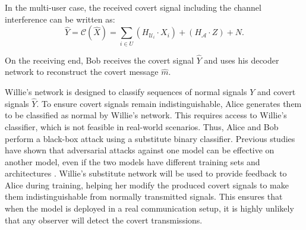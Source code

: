 In the multi-user case, the received covert signal including the channel interference can be written as:
\begin{equation}
	\hat{Y} = \mathcal{C}(\hat{X}) = \sum_{i \in U}(H_{\mathcal{U}_i} \cdot X_i) + (H_{\mathcal{A}} \cdot Z) + N.
\end{equation}

On the receiving end, Bob receives the covert signal \(\hat{Y}\) and uses his decoder network to reconstruct the covert message \(\hat{m}\).

Willie's network is designed to classify sequences of normal signals \(Y\) and covert signals \(\hat{Y}\). To ensure covert signals remain indistinguishable, Alice generates them to be classified as normal by Willie's network. This requires access to Willie's classifier, which is not feasible in real-world scenarios. Thus, Alice and Bob perform a black-box attack using a substitute binary classifier. Previous studies have shown that adversarial attacks against one model can be effective on another model, even if the two models have different training sets and architectures \cite{papernot2016transferability}. Willie's substitute network will be used to provide feedback to Alice during training, helping her modify the produced covert signals to make them indistinguishable from normally transmitted signals. This ensures that when the model is deployed in a real communication setup, it is highly unlikely that any observer will detect the covert transmissions.


